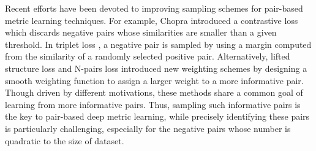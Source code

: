 \documentclass[10pt,twocolumn,letterpaper]{article}
\begin{document}
Recent efforts have been devoted to improving sampling schemes for pair-based metric learning techniques. For example, Chopra \etal \cite{contrass1} introduced a contrastive loss which discards negative pairs whose similarities are smaller than a given threshold. In triplet loss  \cite{Hoffer2015DeepML}, a negative pair is sampled by using a margin computed from the similarity of a randomly selected positive pair. Alternatively, lifted structure loss \cite{lifted-structured-loss} and N-pairs loss \cite{n-pairs} introduced new weighting schemes by designing a smooth weighting function to assign a larger weight to a more informative pair.
Though driven by different motivations, these methods share a common goal of learning from more informative pairs.
Thus, sampling such informative pairs is the key to pair-based deep metric learning, while precisely identifying these pairs is particularly challenging, especially for the negative pairs whose number is quadratic to the size of dataset.
\end{document}
